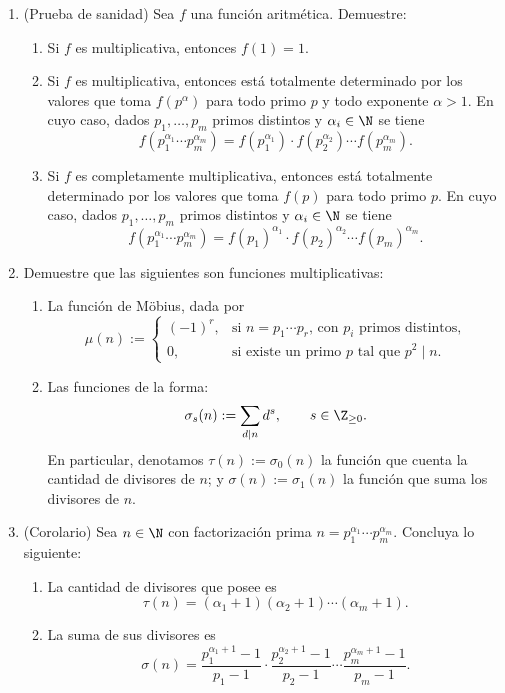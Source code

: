 \documentclass[11pt, reqno]{amsart}
\begin{document}
\begin{enumerate}[resume]
	\item (Prueba de sanidad) Sea $f$ una función aritmética. Demuestre:
		\begin{enumerate}
			\item Si $f$ es multiplicativa, entonces $f(1) = 1$.
			\item Si $f$ es multiplicativa, entonces está totalmente determinado por los valores que toma $f(p^\alpha)$ para todo primo $p$
				y todo exponente $\alpha > 1$.
				En cuyo caso, dados $p_1, \dots, p_m$ primos distintos y $\alpha_i \in \N$ se tiene
				$$ f(p_1^{\alpha_1} \cdots p_m^{\alpha_m}) = f(p_1^{\alpha_1}) \cdot f(p_2^{\alpha_2}) \cdots f(p_m^{\alpha_m}). $$
			\item Si $f$ es completamente multiplicativa, entonces está totalmente determinado por los valores que toma $f(p)$ para todo primo $p$.
				En cuyo caso, dados $p_1, \dots, p_m$ primos distintos y $\alpha_i \in \N$ se tiene
				$$ f(p_1^{\alpha_1} \cdots p_m^{\alpha_m}) = f(p_1)^{\alpha_1} \cdot f(p_2)^{\alpha_2} \cdots f(p_m)^{\alpha_m}. $$
		\end{enumerate}

	\item Demuestre que las siguientes son funciones multiplicativas:
		\begin{enumerate}
			\item La función de Möbius, dada por
				$$ \mu(n) :=
				\begin{cases}
					(-1)^r, & \text{si $n = p_1 \cdots p_r$, con $p_i$ primos distintos,} \\
					0, & \text{si existe un primo $p$ tal que $p^2 \mid n$.}
				\end{cases} $$
			\item Las funciones de la forma:
				$$ \sigma_s(n) := \sum_{d\mid n} d^s, \qquad s \in \Z_{\ge 0}. $$
				En particular, denotamos $\tau(n) := \sigma_0(n)$ la función que cuenta la cantidad de divisores de $n$;
				y $\sigma(n) := \sigma_1(n)$ la función que suma los divisores de $n$.
		\end{enumerate}

	\item (Corolario) Sea $n \in \N$ con factorización prima $n = p_1^{\alpha_1} \cdots p_m^{\alpha_m}$.
		Concluya lo siguiente:
		\begin{enumerate}
			\item La cantidad de divisores que posee es
				$$ \tau(n) = (\alpha_1 + 1)(\alpha_2 + 1) \cdots (\alpha_m + 1). $$
			\item La suma de sus divisores es
				$$ \sigma(n) = \frac{p_1^{\alpha_1 + 1} - 1}{p_1 - 1} \cdot \frac{p_2^{\alpha_2 + 1} - 1}{p_2 - 1}
				\cdots \frac{p_m^{\alpha_m + 1} - 1}{p_m - 1}. $$
		\end{enumerate}
\end{enumerate}
\end{document}
